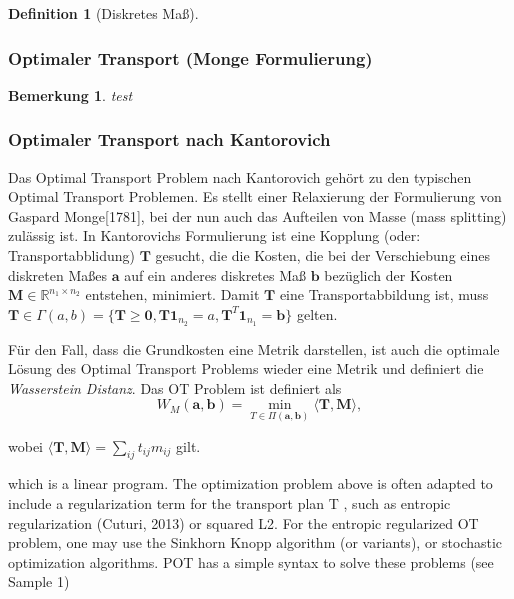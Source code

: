 \documentclass[twoside, 11pt,a4paper]{article}
\newtheorem{definition}[theorem]{Definition}
\newtheorem{remark}[theorem]{Bemerkung}
\numberwithin{equation}{section}
\begin{document}
	\begin{definition}[Diskretes Maß]
		
	\end{definition}
	\subsubsection{Optimaler Transport (Monge Formulierung)}
	\begin{remark}
		test
	\end{remark}
	\subsubsection{Optimaler Transport nach Kantorovich}
	Das Optimal Transport Problem nach Kantorovich gehört zu den typischen Optimal Transport Problemen. Es stellt einer Relaxierung der Formulierung von Gaspard Monge[1781], bei der nun auch das Aufteilen von Masse (mass splitting) zulässig ist.
	In Kantorovichs Formulierung ist eine Kopplung (oder: Transportabblidung) $\boldsymbol{T}$ gesucht, die die Kosten, die bei der Verschiebung eines diskreten Maßes $\boldsymbol{a}$ auf ein anderes diskretes Maß $\boldsymbol{b}$ bezüglich der Kosten $\boldsymbol{M} \in \mathbb{R}^{n_1 \times n_2}$ entstehen, minimiert.
	Damit $\boldsymbol{T}$ eine Transportabbildung ist, muss $\boldsymbol{T} \in \Gamma(a,b) = \lbrace \boldsymbol{T} \geq \boldsymbol{0}, \boldsymbol{T}\boldsymbol{1}_{n_2} = a, \boldsymbol{T}^{T}\boldsymbol{1}_{n_1} = \boldsymbol{b} \rbrace$ gelten.
	
	Für den Fall, dass die Grundkosten eine Metrik darstellen, ist auch die optimale Lösung des Optimal Transport Problems wieder eine Metrik \cite{cuturi2014ground} und definiert die \textit{Wasserstein Distanz}. Das OT Problem ist definiert als
	\begin{equation}
		W_M(\boldsymbol{a},\boldsymbol{b}) = \min_{T \in \Pi(\boldsymbol{a}, \boldsymbol{b})}{\langle \boldsymbol{T}, \boldsymbol{M} \rangle},
	\end{equation}
	
	wobei ${\langle \boldsymbol{T}, \boldsymbol{M} \rangle} = \sum_{ij}{t_{ij}m_{ij}}$ gilt.
	
	which is a linear program. The optimization problem above is often adapted to include a
	regularization term for the transport plan T , such as entropic regularization (Cuturi, 2013)
	or squared L2. For the entropic regularized OT problem, one may use the Sinkhorn Knopp
	algorithm (or variants), or stochastic optimization algorithms. POT has a simple syntax to
	solve these problems (see Sample 1)
	
\end{document}
